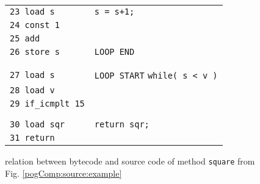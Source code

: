 \begin{figure}[ht!]
\begin{frameit}
{\begin{tabular}{ll}
\lstinline!23 load s!      & \Myspace \lstinline!s = s+1;! \\
\lstinline!24 const 1!	   & \\ 
\lstinline!25 add!	   & \\ 
\lstinline!26 store s!	   & \lstinline!LOOP END! \\ 
                           & \\  & \\ 

\lstinline!27 load s!      & \lstinline!LOOP START!  \lstinline!while( s < v )!\\ 
\lstinline!28 load v!      & \\  
\lstinline!29 if_icmplt 15!& \\  
                           & \\  & \\ 
\lstinline!30 load sqr!      &\lstinline!return sqr;!\\ 
\lstinline!31 return!      &\\
  \end{tabular}

}

  \caption{\sc  relation between bytecode and source code of method \lstinline!square! from Fig. \ref{pogComp:source:example} }
  \label{pogEquiv:compile:prop}
\end{frameit}  
\end{figure}
